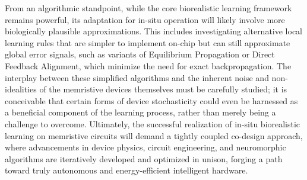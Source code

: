 \noindent From an algorithmic standpoint, while the core biorealistic learning framework remains powerful, its adaptation for in-situ operation will likely involve more biologically plausible approximations. This includes investigating alternative local learning rules that are simpler to implement on-chip but can still approximate global error signals, such as variants of Equilibrium Propagation or Direct Feedback Alignment, which minimize the need for exact backpropagation. The interplay between these simplified algorithms and the inherent noise and non-idealities of the memristive devices themselves must be carefully studied; it is conceivable that certain forms of device stochasticity could even be harnessed as a beneficial component of the learning process, rather than merely being a challenge to overcome. Ultimately, the successful realization of in-situ biorealistic learning on memristive circuits will demand a tightly coupled co-design approach, where advancements in device physics, circuit engineering, and neuromorphic algorithms are iteratively developed and optimized in unison, forging a path toward truly autonomous and energy-efficient intelligent hardware.\\